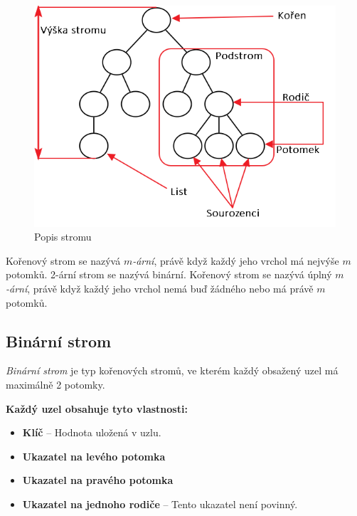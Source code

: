 \documentclass[
  biblatex=false,
  font=serif,
  glossaries=false,
  tables=false,
  theorems=false,
  index
]{kidiplom}
\begin{document}
\begin{figure}[h!]
\centering
	\includegraphics[scale=0.6]{obrazky/2PopisStromu.png}
	\caption{Popis stromu}
\end{figure}

\begin{definition}
Kořenový strom se nazývá $m$\textit{-ární}, právě když každý jeho vrchol má nejvýše $m$ potomků. 2-ární strom se nazývá binární. Kořenový strom se nazývá úplný $m$\textit{-ární}, právě když každý jeho vrchol nemá buď žádného nebo má právě $m$ potomků.\cite{belohlavekVychodil}
\end{definition}
\smallskip

\subsection{Binární strom}
\begin{definition}
\textit{Binární strom} je typ kořenových stromů, ve kterém každý obsažený uzel má maximálně 2 potomky.
\end{definition}
\smallskip

\noindent\textbf{Každý uzel obsahuje tyto vlastnosti:}
\begin{itemize}
\item \textbf{Klíč} -- Hodnota uložená v uzlu.
\item \textbf{Ukazatel na levého potomka}
\item \textbf{Ukazatel na pravého potomka}
\item \textbf{Ukazatel na jednoho rodiče} -- Tento ukazatel není povinný.
\end{itemize}
\end{document}

